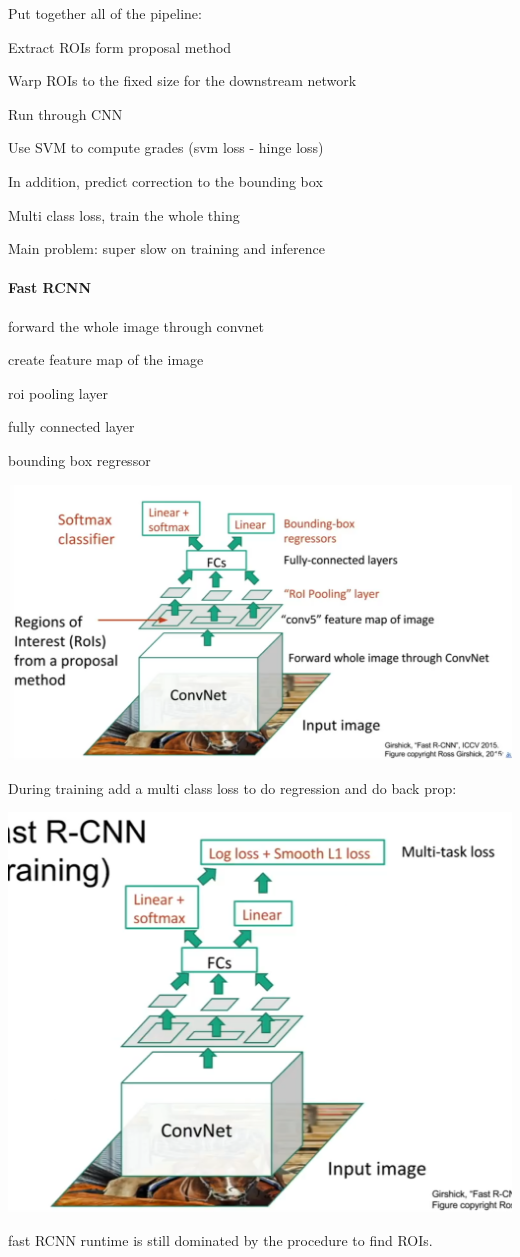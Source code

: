 Put together all of the pipeline: 

Extract ROIs form proposal method

Warp ROIs to the fixed size for the downstream network

Run through CNN

Use SVM to compute grades (svm loss - hinge loss)

In addition, predict correction to the bounding box

Multi class loss, train the whole thing

Main problem: super slow on training and inference

\paragraph{Fast RCNN}

forward the whole image through convnet

create feature map of the image

roi pooling layer

fully connected layer

bounding box regressor

\includegraphics[width=0.5\columnwidth]{fei_fei_li/lecture_11/fast-rcnn.png}

During training add a multi class loss to do regression and do back prop:

\includegraphics[width=0.5\columnwidth]{fei_fei_li/lecture_11/fast_rcnn_2.png}

fast RCNN runtime is still dominated by the procedure to find ROIs.

